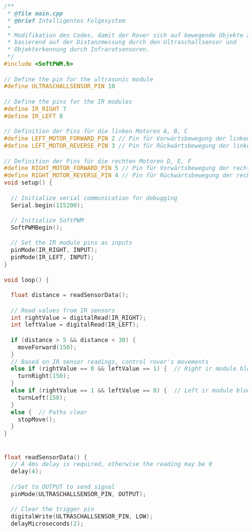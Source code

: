 \documentclass{vorlage-design-main}
\begin{document}
\begin{lstlisting}[language={C++}]
/**
 * @file main.cpp
 * @brief Intelligentes Folgesystem
 * 
 * Modifikation des Codes, damit der Rover sich auf bewegende Objekte zubewegt,
 * basierend auf der Distanzmessung durch den Ultraschallsensor und 
 * Objekterkennung durch Infrarotsensoren.
 */
#include <SoftPWM.h>

// Define the pin for the ultrasonic module
#define ULTRASCHALLSENSOR_PIN 10

// Define the pins for the IR modules
#define IR_RIGHT 7
#define IR_LEFT 8

// Definition der Pins für die linken Motoren A, B, C
#define LEFT_MOTOR_FORWARD_PIN 2 // Pin für Vorwärtsbewegung der linken Motoren (A, B, C)
#define LEFT_MOTOR_REVERSE_PIN 3 // Pin für Rückwärtsbewegung der linken Motoren (A, B, C)

// Definition der Pins für die rechten Motoren D, E, F
#define RIGHT_MOTOR_FORWARD_PIN 5 // Pin für Vorwärtsbewegung der rechten Motoren (D, E, F)
#define RIGHT_MOTOR_REVERSE_PIN 4 // Pin für Rückwärtsbewegung der rechten Motoren (D, E, F)
void setup() {

  // Initialize serial communication for debugging
  Serial.begin(115200);

  // Initialize SoftPWM
  SoftPWMBegin();

  // Set the IR module pins as inputs
  pinMode(IR_RIGHT, INPUT);
  pinMode(IR_LEFT, INPUT);
}

void loop() {

  float distance = readSensorData();

  // Read values from IR sensors
  int rightValue = digitalRead(IR_RIGHT);
  int leftValue = digitalRead(IR_LEFT);

  if (distance > 5 && distance < 30) {
    moveForward(150);
  }
  // Based on IR sensor readings, control rover's movements
  else if (rightValue == 0 && leftValue == 1) {  // Right ir module blocked
    turnRight(150);
  } 
  else if (rightValue == 1 && leftValue == 0) {  // Left ir module blocked
    turnLeft(150);
  } 
  else {  // Paths clear
    stopMove();
  }
}


float readSensorData() {
  // A 4ms delay is required, otherwise the reading may be 0
  delay(4);

  //Set to OUTPUT to send signal
  pinMode(ULTRASCHALLSENSOR_PIN, OUTPUT);

  // Clear the trigger pin
  digitalWrite(ULTRASCHALLSENSOR_PIN, LOW);
  delayMicroseconds(2);


\end{lstlisting}
\end{document}
